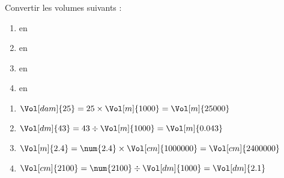 \begin{methode*1}
\begin{changemargin}{0mm}{-27mm}
\begin{center}
\begin{footnotesize}
{\begin{longtable}{|>{\centering\arraybackslash}m{}|*{21}{c|}}
                    \hspace{2mm} & \hspace{2mm} & \hspace{2mm} & \hspace{2mm} & \hspace{2mm} & \hspace{2mm} & \hspace{2mm} & \hspace{2mm} & \hspace{2mm} & \hspace{2mm} & \hspace{2mm} & \hspace{2mm} & \hspace{2mm} & \hspace{2mm} & \hspace{2mm} & \hspace{2mm} & \hspace{2mm} & \hspace{2mm} & \hspace{2mm} & \hspace{2mm} & \hspace{2mm}  \\
                    \hline   
                \end{longtable}
                }
            \end{footnotesize}
            \vspace*{-10mm}
        \end{center}
    \end{changemargin}
    \exercice
        Convertir les volumes suivants :
        \begin{multicols}{4}
            \begin{enumerate}
                \item {} en \Vol[m]{}
                \item {} en \Vol[m]{}
                \item {} en \Vol[cm]{}
                \item {} en \Vol[dm]{}
            \end{enumerate}
        \end{multicols}
    \correction
    \begin{multicols}{2}
        \begin{enumerate}
            \item $\Vol[dam]{25}=25\times\Vol[m]{1000}=\Vol[m]{25000}$ 
            \item $\Vol[dm]{43}=43\div\Vol[m]{1000}=\Vol[m]{0.043}$ 
            \item $\Vol[m]{2.4}=\num{2.4}\times\Vol[cm]{1000000}=\Vol[cm]{2400000}$ 
            \item $\Vol[cm]{2100}=\num{2100}\div\Vol[dm]{1000}=\Vol[dm]{2.1}$
        \end{enumerate}
    \end{multicols}
\end{methode*1}
